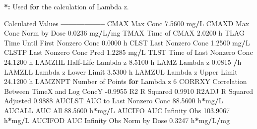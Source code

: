 \documentclass[12pt,]{krantz}
\newenvironment{Shaded}{\begin{snugshade}}{\end{snugshade}}
\newcommand{\DecValTok}[1]{\textcolor[rgb]{0.00,0.00,0.81}{#1}}
\newcommand{\FloatTok}[1]{\textcolor[rgb]{0.00,0.00,0.81}{#1}}
\newcommand{\StringTok}[1]{\textcolor[rgb]{0.31,0.60,0.02}{#1}}
\newcommand{\ControlFlowTok}[1]{\textcolor[rgb]{0.13,0.29,0.53}{\textbf{#1}}}
\newcommand{\OperatorTok}[1]{\textcolor[rgb]{0.81,0.36,0.00}{\textbf{#1}}}
\newcommand{\ErrorTok}[1]{\textcolor[rgb]{0.64,0.00,0.00}{\textbf{#1}}}
\newcommand{\NormalTok}[1]{#1}
\theoremstyle{definition}
\theoremstyle{definition}
\theoremstyle{definition}
\theoremstyle{remark}
\begin{document}
\begin{Shaded}
\begin{Highlighting}[]
{{{{{{{{\OperatorTok{*}\ErrorTok{:}\StringTok{ }\NormalTok{Used }\ControlFlowTok{for}\NormalTok{ the calculation of Lambda z.}


\NormalTok{Calculated Values}
\OperatorTok{-----------------}
\NormalTok{CMAX       Max Conc                                        }\FloatTok{7.5600}\NormalTok{ mg}\OperatorTok{/}\NormalTok{L}
\NormalTok{CMAXD      Max Conc Norm by Dose                           }\FloatTok{0.0236}\NormalTok{ mg}\OperatorTok{/}\NormalTok{L}\OperatorTok{/}\NormalTok{mg}
\NormalTok{TMAX       Time of CMAX                                    }\FloatTok{2.0200}\NormalTok{ h}
\NormalTok{TLAG       Time Until First Nonzero Conc                   }\FloatTok{0.0000}\NormalTok{ h}
\NormalTok{CLST       Last Nonzero Conc                               }\FloatTok{1.2500}\NormalTok{ mg}\OperatorTok{/}\NormalTok{L}
\NormalTok{CLSTP      Last Nonzero Conc Pred                          }\FloatTok{1.2285}\NormalTok{ mg}\OperatorTok{/}\NormalTok{L}
\NormalTok{TLST       Time of Last Nonzero Conc                      }\FloatTok{24.1200}\NormalTok{ h}
\NormalTok{LAMZHL     Half}\OperatorTok{-}\NormalTok{Life Lambda z                              }\FloatTok{8.5100}\NormalTok{ h}
\NormalTok{LAMZ       Lambda z                                        }\FloatTok{0.0815} \OperatorTok{/}\NormalTok{h}
\NormalTok{LAMZLL     Lambda z Lower Limit                            }\FloatTok{3.5300}\NormalTok{ h}
\NormalTok{LAMZUL     Lambda z Upper Limit                           }\FloatTok{24.1200}\NormalTok{ h}
\NormalTok{LAMZNPT    Number of Points }\ControlFlowTok{for}\NormalTok{ Lambda z                   }\DecValTok{6}
\NormalTok{CORRXY     Correlation Between TimeX and Log ConcY        }\OperatorTok{-}\FloatTok{0.9955} 
\NormalTok{R2         R Squared                                       }\FloatTok{0.9910} 
\NormalTok{R2ADJ      R Squared Adjusted                              }\FloatTok{0.9888} 
\NormalTok{AUCLST     AUC to Last Nonzero Conc                       }\FloatTok{88.5600}\NormalTok{ h}\OperatorTok{*}\NormalTok{mg}\OperatorTok{/}\NormalTok{L}
\NormalTok{AUCALL     AUC All                                        }\FloatTok{88.5600}\NormalTok{ h}\OperatorTok{*}\NormalTok{mg}\OperatorTok{/}\NormalTok{L}
\NormalTok{AUCIFO     AUC Infinity Obs                              }\FloatTok{103.9067}\NormalTok{ h}\OperatorTok{*}\NormalTok{mg}\OperatorTok{/}\NormalTok{L}
\NormalTok{AUCIFOD    AUC Infinity Obs Norm by Dose                   }\FloatTok{0.3247}\NormalTok{ h}\OperatorTok{*}\NormalTok{mg}\OperatorTok{/}\NormalTok{L}\OperatorTok{/}\NormalTok{mg}
}}}}}}}}
\end{Highlighting}
\end{Shaded}
\end{document}
